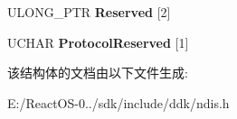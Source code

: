 \begin{DoxyCompactItemize}
\begin{tabbing}
\end{tabbing}\item 
\mbox{\label{struct___n_d_i_s___p_a_c_k_e_t_aa047c83ef2db4563d7fd832fb7ef148d}} 
U\+L\+O\+N\+G\+\_\+\+P\+TR {\bfseries Reserved} \mbox{[}2\mbox{]}
\item 
\mbox{\label{struct___n_d_i_s___p_a_c_k_e_t_af9187550da534106c9bbb290750e7f96}} 
U\+C\+H\+AR {\bfseries Protocol\+Reserved} \mbox{[}1\mbox{]}
\end{DoxyCompactItemize}


该结构体的文档由以下文件生成\+:\begin{DoxyCompactItemize}
\item 
E\+:/\+React\+O\+S-\/0../sdk/include/ddk/ndis.\+h\end{DoxyCompactItemize}
